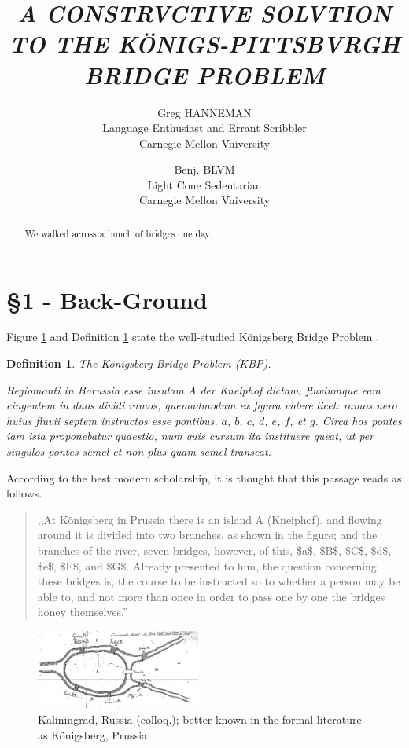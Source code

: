 \documentclass[twocolumn]{article}
\title{\em A CONSTRVCTIVE SOLVTION TO THE K\"ONIGS-PITTSBVRGH BRIDGE PROBLEM}
\author{Greg HANNEMAN\\
	Language Enthusiast and Errant Scribbler
	\\
        Carnegie Mellon Vniversity
	\and
	Benj. BLVM \\
	Light Cone Sedentarian \\
	Carnegie Mellon Vniversity}
\date{}
\theoremstyle{plain}  %
\newtheorem{defn}{Definition}
\theoremstyle{definition}  %
\theoremstyle{remark}  %
\begin{document}

\maketitle
\pagestyle{empty}
\thispagestyle{empty}

\begin{abstract}
	We walked across a bunch of bridges one day.
\end{abstract}



\section*{\S 1 - Back-Ground}

Figure \ref{fig:koenigs} and Definition \ref{Def-Konigs} state the well-studied K\"onigsberg Bridge Problem \cite{original}. %

\begin{defn} \label{Def-Konigs}
	The K\"onigsberg Bridge Problem (KBP). %

Regiomonti in Borussia esse insulam A {\em der Kneiphof} dictam, fluviumque eam cingentem in duos dividi ramos, quemadmodum ex figura videre licet: ramos uero huius fluvii septem instructos esse pontibus, $a$, $b$, $c$, $d$, $e$, $f$, et $g$.  Circa hos pontes iam ista proponebatur quaestio, num quis cursum ita instituere queat, ut per singulos pontes semel et non plus quam semel transeat.
\end{defn}

According to the best modern scholarship, it is thought that this passage reads as follows.

\begin{quote}
	,,At K\"onigsberg in Prussia there is an island A (Kneiphof), and flowing around it is divided into two branches, as shown in the figure; and the branches of the river, seven bridges, however, of this, \$a\$, \$B\$, \$C\$, \$d\$, \$e\$, \$F\$, and \$G\$. Already presented to him, the question concerning these bridges is, the course to be instructed so to whether a person may be able to, and not more than once in order to pass one by one the bridges honey themselves.''
\end{quote}

\begin{figure}[h]
\centering
	\includegraphics[width=0.48\textwidth]{koenigsburg.pdf}
	\caption{Kaliningrad, Russia (colloq.); better known in the formal literature as K\"onigsberg, Prussia}
	\label{fig:koenigs}
\end{figure}
\end{document}
